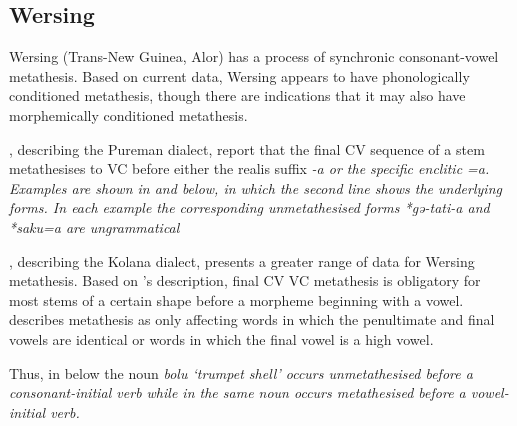 \subsection{Wersing}\label{sec:Wer}
Wersing (Trans-New Guinea, Alor) has a process of
synchronic consonant-vowel metathesis.
Based on current data, Wersing appears to have phonologically
conditioned metathesis, though there are indications
that it may also have morphemically conditioned metathesis.

\cite{sche14}, describing the Pureman dialect,
report that the final CV sequence
of a stem metathesises to VC before
either the realis suffix \it{-a} or the specific enclitic \it{=a}.
Examples are shown in  and  below,
in which the second line shows the underlying forms.
In each example the corresponding unmetathesised forms \it{*gə-tati-a}
and \it{*saku=a} are ungrammatical

\begin{multicols}{2}
\let\eachwordone=\itshape
	\begin{exe}
		\label{ex:WerMet1}
		\label{ex:WerMet2}
	\end{exe}
\end{multicols}

\cite{ba18}, describing the Kolana dialect,
presents a greater range of data for Wersing metathesis.
Based on \citeauthor{ba18}'s description,
final CV {\ra} VC metathesis is obligatory
for most stems of a certain shape before
a morpheme beginning with a vowel.
\citeauthor{ba18} describes metathesis as only affecting
words in which the penultimate and final vowels are identical
or words in which the final vowel is a high vowel.

Thus, in  below the noun \it{bolu}
`trumpet shell' occurs unmetathesised before a
consonant-initial verb while in 
the same noun occurs metathesised before a vowel-initial verb.

\begin{exe}
\let\eachwordone=\itshape
	\label{ex:bolu}
	\label{ex:boul}
\end{exe}

